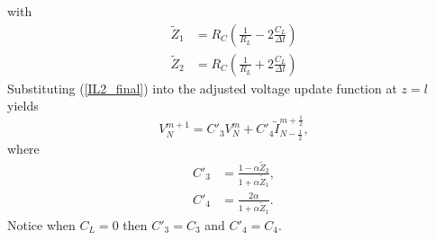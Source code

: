 \documentclass[dutch, a4paper, 11pt]{article}
\begin{document}
\begin{multicols}{2}
\begin{itemize}
\begin{equation}
        \label{IL2_final}
    \end{equation}
    with
    \begin{align}
        \tilde{Z}_{1} &= R_{C}\left(\frac{1}{R_{L}}-2\frac{C_{L}}{\Delta t}\right)\\
        \tilde{Z}_{2} &= R_{C}\left(\frac{1}{R_{L}}+2\frac{C_{L}}{\Delta t}\right)
    \end{align}
    Substituting (\ref{IL2_final}) into the adjusted voltage update function at $z=l$ yields
    \begin{equation}
        V^{m+1}_{N} = C'_{3}V^{m}_N + C'_{4}\tilde{I}^{m+\frac{1}{2}}_{N-\frac{1}{2}},
    \end{equation}
    where
    \begin{align}
        C'_{3} & = \frac{1-\alpha\tilde{Z}_{2}}{1+\alpha\tilde{Z}_{1}},\\
        C'_{4} & = \frac{2\alpha}{1+\alpha\tilde{Z}_{1}}.
    \end{align}
    Notice when $C_{L} = 0$ then $C'_{3} = C_{3}$ and $C'_{4} = C_{4}$.
\end{itemize}

\end{multicols}
\end{document}
